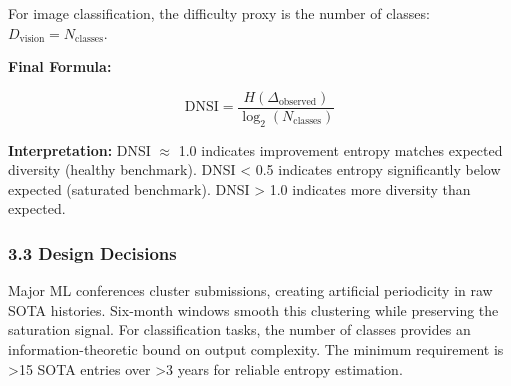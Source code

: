For image classification, the difficulty proxy is the number of classes: $D_{\text{vision}} = N_{\text{classes}}$.

\textbf{Final Formula:}

$$\text{DNSI} = \frac{H(\Delta_{\text{observed}})}{\log_2(N_{\text{classes}})}$$

\textbf{Interpretation:} DNSI $\approx$ 1.0 indicates improvement entropy matches expected diversity (healthy benchmark). DNSI < 0.5 indicates entropy significantly below expected (saturated benchmark). DNSI > 1.0 indicates more diversity than expected.

\subsubsection{3.3 Design Decisions}

Major ML conferences cluster submissions, creating artificial periodicity in raw SOTA histories. Six-month windows smooth this clustering while preserving the saturation signal. For classification tasks, the number of classes provides an information-theoretic bound on output complexity. The minimum requirement is >15 SOTA entries over >3 years for reliable entropy estimation.
